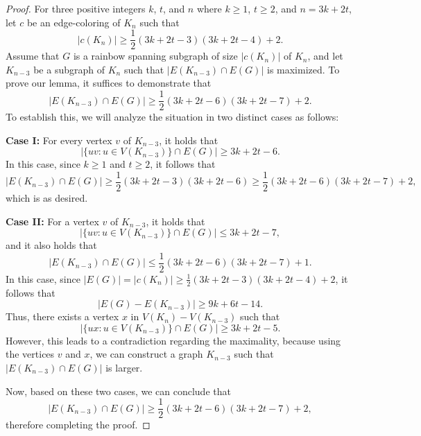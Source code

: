 \documentclass[10pt,a4paper]{amsart}
\begin{document}
\begin{proof}
  For three positive integers \(k\), \(t\), and \(n\) where $k\geq1$, \(t \geq 2\), and \(n = 3k + 2t\), let \(c\) be an edge-coloring of \(K_n\) such that 
\[
|c(K_n)| \geq \frac{1}{2}(3k + 2t - 3)(3k + 2t - 4) + 2.
\]
Assume that \(G\) is a rainbow spanning subgraph of size \(|c(K_n)|\) of \(K_n\), and let \(K_{n-3}\) be a subgraph of \(K_n\) such that \(|E(K_{n-3}) \cap E(G)|\) is maximized. To prove our lemma, it suffices to demonstrate that 
\[
|E(K_{n-3}) \cap E(G)| \geq \frac{1}{2}(3k + 2t - 6)(3k + 2t - 7) + 2.
\]
To establish this,  we will analyze the situation in two distinct cases as follows:

\noindent
{\bf Case I:} For every vertex \(v\) of \(K_{n-3}\), it holds that
   \[
   |\{uv : u \in V(K_{n-3})\} \cap E(G)| \geq 3k + 2t - 6.
   \]
   In this case, since $k\geq1$ and \(t \geq 2\), it follows that 
   \[
   |E(K_{n-3}) \cap E(G)| \geq \frac{1}{2}(3k + 2t - 3)(3k + 2t - 6) \geq \frac{1}{2}(3k + 2t - 6)(3k + 2t - 7) + 2,
   \]
   which is as desired.
   
   \noindent
 {\bf Case II:} For a vertex \(v\) of \(K_{n-3}\), it holds that
   \[
   |\{uv : u \in V(K_{n-3})\} \cap E(G)| \leq 3k + 2t - 7,
   \]
   and it also holds that 
   \[
   |E(K_{n-3}) \cap E(G)| \leq \frac{1}{2}(3k + 2t - 6)(3k + 2t - 7) + 1.
   \]
   In this case, since \(|E(G)| = |c(K_n)| \geq \frac{1}{2}(3k + 2t - 3)(3k + 2t - 4) + 2\), it follows that 
   \[
   |E(G) - E(K_{n-3})| \geq 9k + 6t - 14.
   \]
   Thus, there exists a vertex \(x\) in \(V(K_n) - V(K_{n-3})\) such that 
   \[
   |\{ux : u \in V(K_{n-3})\} \cap E(G)| \geq 3k + 2t - 5.
   \]
   However, this leads to a contradiction regarding the maximality, because using the vertices \(v\) and \(x\), we can construct a graph \(K_{n-3}\) such that 
   \(|E(K_{n-3}) \cap E(G)|\) is larger.
   
Now, based on these two cases, we can conclude that 
\[
|E(K_{n-3}) \cap E(G)| \geq \frac{1}{2}(3k + 2t - 6)(3k + 2t - 7) + 2,
\]
therefore completing the proof.
\end{proof}
\end{document}
